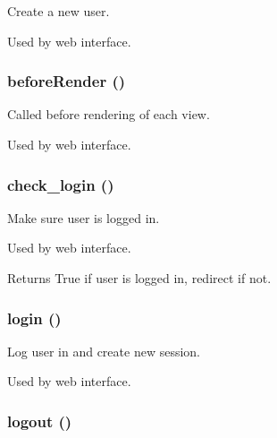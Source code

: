 Create a new user. 

Used by web interface. \hypertarget{class_users_controller_ac89dd29d2229bbc37879d31f95d06e97}{
\subsubsection[{beforeRender}]{\setlength{\rightskip}{0pt plus 5cm}beforeRender ()}}
\label{class_users_controller_ac89dd29d2229bbc37879d31f95d06e97}


Called before rendering of each view. 

Used by web interface. \hypertarget{class_users_controller_a648185926782004aa207e8bdfdfe8197}{
\subsubsection[{check\_\-login}]{\setlength{\rightskip}{0pt plus 5cm}check\_\-login ()}}
\label{class_users_controller_a648185926782004aa207e8bdfdfe8197}


Make sure user is logged in. 

Used by web interface. \begin{DoxyReturn}{Returns}
True if user is logged in, redirect if not. 
\end{DoxyReturn}
\hypertarget{class_users_controller_aa311da27ba5706f5710cea7706c8eae1}{
\subsubsection[{login}]{\setlength{\rightskip}{0pt plus 5cm}login ()}}
\label{class_users_controller_aa311da27ba5706f5710cea7706c8eae1}


Log user in and create new session. 

Used by web interface. \hypertarget{class_users_controller_a082405d89acd6835c3a7c7a08a7adbab}{
\subsubsection[{logout}]{\setlength{\rightskip}{0pt plus 5cm}logout ()}}
\label{class_users_controller_a082405d89acd6835c3a7c7a08a7adbab}


